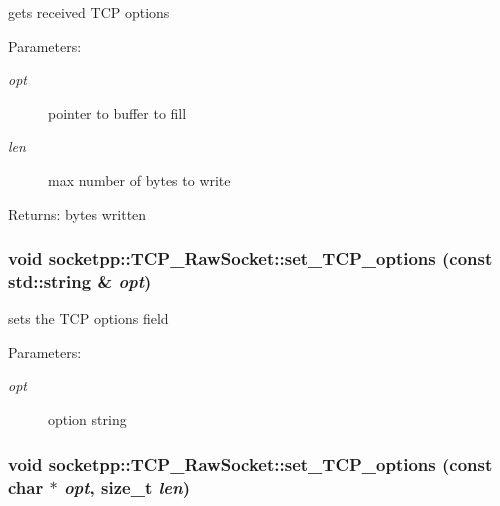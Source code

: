 gets received TCP options 

\begin{Desc}
\item[Parameters:]
\begin{description}
\item[{\em opt}]pointer to buffer to fill \item[{\em len}]max number of bytes to write \end{description}
\end{Desc}
\begin{Desc}
\item[Returns:]bytes written \end{Desc}
\hypertarget{classsocketpp_1_1TCP__RawSocket_7bc9043e86c6f328cb99d98c4bfca05a}{
\subsubsection[{set\_\-TCP\_\-options}]{\setlength{\rightskip}{0pt plus 5cm}void socketpp::TCP\_\-RawSocket::set\_\-TCP\_\-options (const std::string \& {\em opt})}}
\label{classsocketpp_1_1TCP__RawSocket_7bc9043e86c6f328cb99d98c4bfca05a}


sets the TCP options field 

\begin{Desc}
\item[Parameters:]
\begin{description}
\item[{\em opt}]option string \end{description}
\end{Desc}
\hypertarget{classsocketpp_1_1TCP__RawSocket_c38e057fc6ece02026e71b7ee872533f}{
\subsubsection[{set\_\-TCP\_\-options}]{\setlength{\rightskip}{0pt plus 5cm}void socketpp::TCP\_\-RawSocket::set\_\-TCP\_\-options (const char $\ast$ {\em opt}, \/  size\_\-t {\em len})}}
\label{classsocketpp_1_1TCP__RawSocket_c38e057fc6ece02026e71b7ee872533f}


